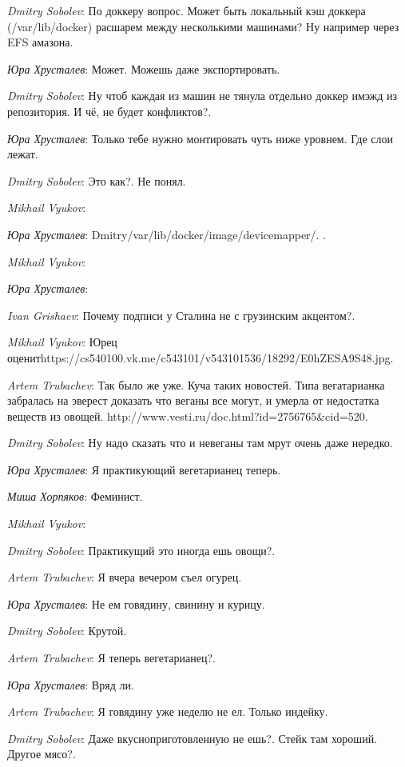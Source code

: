 \documentclass[10pt]{book}
\newcommand{\AUTHOR}[1]{\emph{#1}:}
\begin{document}
\AUTHOR{Dmitry Sobolev} По доккеру вопрос. Может быть  локальный кэш доккера (/var/lib/docker) расшарем между несколькими машинами? Ну например через EFS амазона.

\AUTHOR{Юра Хрусталев} Может. Можешь даже экспортировать.

\AUTHOR{Dmitry Sobolev} Ну чтоб каждая из машин не тянула отдельно доккер имэжд из репозитория. И чё, не будет конфликтов?.

\AUTHOR{Юра Хрусталев} Только тебе нужно монтировать чуть ниже уровнем. Где слои лежат.

\AUTHOR{Dmitry Sobolev} Это как?. Не понял.

\AUTHOR{Mikhail Vyukov}

\AUTHOR{Юра Хрусталев} Dmitry/var/lib/docker/image/devicemapper/. \0.

\AUTHOR{Mikhail Vyukov}

\AUTHOR{Юра Хрусталев}

\AUTHOR{Ivan Grishaev} Почему подписи у Сталина не с грузинским акцентом?.

\AUTHOR{Mikhail Vyukov}  Юрец оценитhttps://cs540100.vk.me/c543101/v543101536/18292/E0hZESA9S48.jpg.

\AUTHOR{Artem Trubachev} Так было же уже. Куча таких новостей. Типа вегатарианка забралась на эверест доказать что веганы все могут, и умерла от недостатка веществ из овощей. http://www.vesti.ru/doc.html?id=2756765&cid=520.

\AUTHOR{Dmitry Sobolev} Ну надо сказать что и невеганы там мрут очень даже нередко.

\AUTHOR{Юра Хрусталев} Я практикующий вегетарианец теперь.

\AUTHOR{Миша Хорпяков} Феминист.

\AUTHOR{Mikhail Vyukov}

\AUTHOR{Dmitry Sobolev} Практикущий это иногда ешь овощи?.

\AUTHOR{Artem Trubachev} Я вчера вечером съел огурец.

\AUTHOR{Юра Хрусталев} Не ем говядину, свинину и курицу.

\AUTHOR{Dmitry Sobolev} Крутой.

\AUTHOR{Artem Trubachev} Я теперь вегетарианец?.

\AUTHOR{Юра Хрусталев} Вряд ли.

\AUTHOR{Artem Trubachev} Я говядину уже неделю не ел. Только индейку.

\AUTHOR{Dmitry Sobolev} Даже вкусноприготовленную не ешь?. Стейк там хороший. Другое мясо?.
\end{document}

